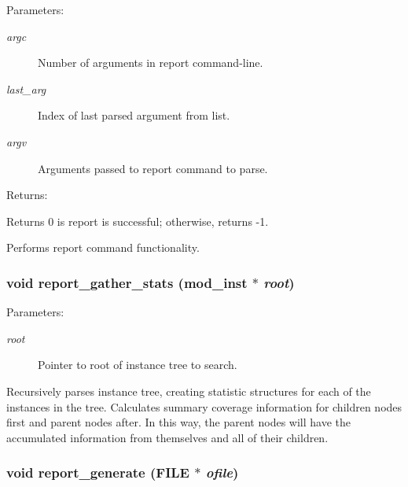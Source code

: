 \begin{Desc}
\item[Parameters: ]\par
\begin{description}
\item[{\em 
argc}]Number of arguments in report command-line. \item[{\em 
last\_\-arg}]Index of last parsed argument from list. \item[{\em 
argv}]Arguments passed to report command to parse.\end{description}
\end{Desc}
\begin{Desc}
\item[Returns: ]\par
Returns 0 is report is successful; otherwise, returns -1.\end{Desc}
Performs report command functionality. 
\subsubsection{\setlength{\rightskip}{0pt plus 5cm}void report\_\-gather\_\-stats ({\bf mod\_\-inst} $\ast$ {\em root})}\label{report_8c_a12}


\begin{Desc}
\item[Parameters: ]\par
\begin{description}
\item[{\em 
root}]Pointer to root of instance tree to search.\end{description}
\end{Desc}
Recursively parses instance tree, creating statistic structures for each of the instances in the tree. Calculates summary coverage information for children nodes first and parent nodes after. In this way, the parent nodes will have the accumulated information from themselves and all of their children. 
\subsubsection{\setlength{\rightskip}{0pt plus 5cm}void report\_\-generate (FILE $\ast$ {\em ofile})}\label{report_8c_a14}


